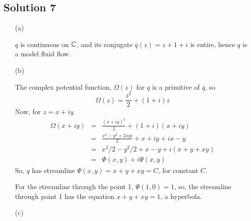\subsection*{Solution 7}

\begin{itemize}
\item[(a)]

$q$ is continuous on $\mathbb{C}$, and its conjugate
$\overline{q}(z) = z+1+i$
is entire, hence $q$ is a model fluid flow.

\item[(b)]

The complex potential function, $\Omega(z)$ for $q$ is a primitive of
$\overline{q}$, so
\[
\Omega(z) = \frac{z^2}{2}+(1+i)z
\]
Now, for $z=x+iy$
\begin{eqnarray*}
\Omega(x+iy)
	&=& \frac{ (x+iy)^2 }{ 2 } + (1+i)(x+iy) \\
	&=& \frac{ x^2-y^2 +2xyi }{2} + x + iy + ix - y \\
	&=& x^2/2 - y^2/2 + x - y + i(x + y + xy) \\
	&=& \Phi(x,y) + i\Psi(x,y)
\end{eqnarray*}
So, $q$ has streamline $\Psi(x,y)=x+y+xy=C$, for constant $C$.

For the streamline through the point 1, $\Psi(1,0) = 1$, so, the
streamline through point 1 has the equation $x+y+xy=1$, a hyperbola.

\todo

\item[(c)]

\todo

\end{itemize}

